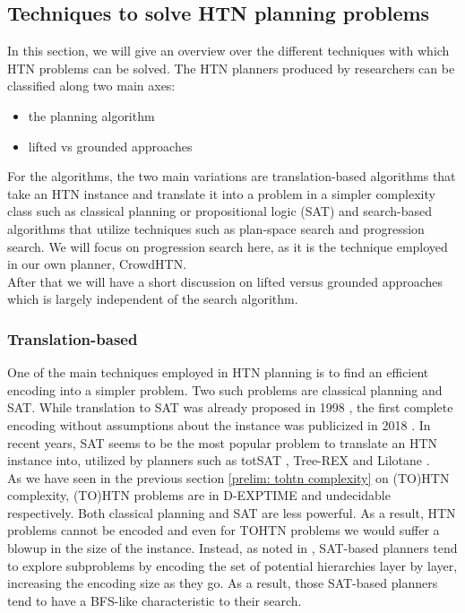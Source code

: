 \subsection{Techniques to solve HTN planning problems}
\label{prelim: techniques}
In this section, we will give an overview over the different techniques with which HTN problems can be solved. The HTN planners produced by researchers can be classified along two main axes:
\begin{itemize}
	\item the planning algorithm
	\item lifted vs grounded approaches
\end{itemize}
For the algorithms, the two main variations are translation-based algorithms that take an HTN instance and translate it into a problem in a simpler complexity class such as classical planning or propositional logic (SAT) and search-based algorithms that utilize techniques such as plan-space search and progression search. We will focus on progression search here, as it is the technique employed in our own planner, CrowdHTN. \\
After that we will have a short discussion on lifted versus grounded approaches which is largely independent of the search algorithm.
\begin{comment}
- multiple ways to solve HTN instances
- planners can be classified on two axis: the algorithm and lifted vs grounded
- in practise, most algorithms are based on translation to SAT or on search algorithms
- we will focus on search-based as we will see in later section \ref{prelim: crowdhtn} that this is what our own planner utilizes
\end{comment}

\subsubsection{Translation-based}
\label{prelim: translation based planners}
One of the main techniques employed in HTN planning is to find an efficient encoding into a simpler problem. Two such problems are classical planning \cite{alford2016bound} and SAT. While translation to SAT was already proposed in 1998 \cite{mali1998encoding}, the first complete encoding without assumptions about the instance was publicized in 2018 \cite{behnke2018totsat}. In recent years, SAT seems to be the most popular problem to translate an HTN instance into, utilized by planners such as totSAT \cite{behnke2018totsat, behnke2018tracking}, Tree-REX \cite{schreiber2019tree} and Lilotane \cite{schreiber2021lilotane}. \\
As we have seen in the previous section \ref{prelim: tohtn complexity} on (TO)HTN complexity, (TO)HTN problems are in D-EXPTIME and undecidable respectively. Both classical planning and SAT are less powerful. As a result, HTN problems cannot be encoded and even for TOHTN problems we would suffer a blowup in the size of the instance. Instead, as noted in \cite{schreiber2019tree}, SAT-based planners tend to explore subproblems by encoding the set of potential hierarchies layer by layer, increasing the encoding size as they go. As a result, those SAT-based planners tend to have a BFS-like characteristic to their search.

